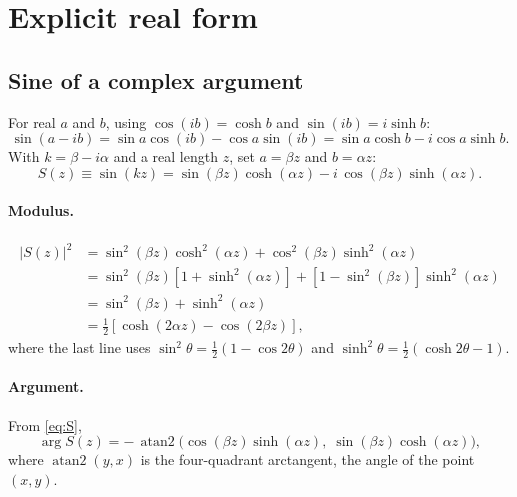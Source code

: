 \section{Explicit real form}

\subsection{Sine of a complex argument}

For real $a$ and $b$, using $\cos(ib) = \cosh b$ and $\sin(ib) = i\sinh b$:
\begin{equation}
  \sin(a - ib) = \sin a\cos(ib) - \cos a\sin(ib)
               = \sin a\cosh b - i\cos a\sinh b.
\end{equation}
With $k = \beta - i\alpha$ and a real length $z$, set $a = \beta z$ and
$b = \alpha z$:
\begin{equation}
  S(z) \equiv \sin(kz) = \sin(\beta z)\cosh(\alpha z) - i\,\cos(\beta z)\sinh(\alpha z).
  \label{eq:S}
\end{equation}

\paragraph{Modulus.}
\begin{align}
  |S(z)|^2 &= \sin^2(\beta z)\cosh^2(\alpha z) + \cos^2(\beta z)\sinh^2(\alpha z) \nonumber\\
           &= \sin^2(\beta z)\left[1 + \sinh^2(\alpha z)\right] + \left[1 - \sin^2(\beta z)\right]\sinh^2(\alpha z) \nonumber\\
           &= \sin^2(\beta z) + \sinh^2(\alpha z) \label{eq:abs_sin}\\
           &= \tfrac{1}{2}\left[\cosh(2\alpha z) - \cos(2\beta z)\right], \label{eq:abs_sin_double}
\end{align}
where the last line uses $\sin^2\theta = \tfrac12(1-\cos2\theta)$ and
$\sinh^2\theta = \tfrac12(\cosh 2\theta - 1)$.

\paragraph{Argument.}
From \cref{eq:S},
\begin{equation}
  \arg S(z) = -\,\operatorname{atan2}\!\Big(\cos(\beta z)\sinh(\alpha z),\; \sin(\beta z)\cosh(\alpha z)\Big),
  \label{eq:argS}
\end{equation}
where $\operatorname{atan2}(y, x)$ is the four-quadrant arctangent, the
angle of the point $(x, y)$.

